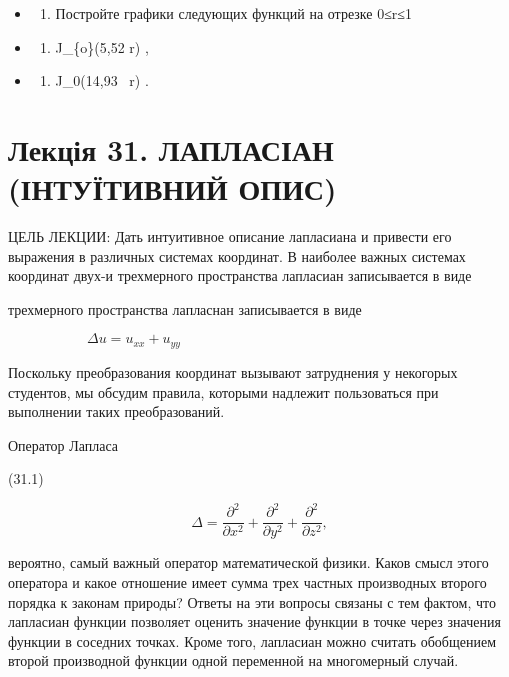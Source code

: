 \documentclass[
  ukrainian,
]{article}
\providecommand{\tightlist}{%
  \setlength{\itemsep}{0pt}\setlength{\parskip}{0pt}}
\begin{document}
\begin{itemize}
\tightlist
\item
  \begin{enumerate}
  \def\labelenumi{\arabic{enumi}.}
  \setcounter{enumi}{5}
  \tightlist
  \item
    Постройте графики следующих функций на отрезке 0≤r≤1
  \end{enumerate}
\item
  \begin{enumerate}
  \def\labelenumi{\alph{enumi})}
  \tightlist
  \item
    J\_\{o\}(5,52 r) ,
  \end{enumerate}
\item
  \begin{enumerate}
  \def\labelenumi{\arabic{enumi})}
  \setcounter{enumi}{5}
  \tightlist
  \item
    J\_0(14,93 ~r) .
  \end{enumerate}
\end{itemize}

\section{Лекція 31. ЛАПЛАСІАН (ІНТУЇТИВНИЙ
ОПИС)}\label{ux43bux435ux43aux446ux456ux44f-31.-ux43bux430ux43fux43bux430ux441ux456ux430ux43d-ux456ux43dux442ux443ux457ux442ux438ux432ux43dux438ux439-ux43eux43fux438ux441}

ЦЕЛЬ ЛЕКЦИИ: Дать интуитивное описание лапласиана и привести его
выражения в различных системах координат. В наиболее важных системах
координат двух-и трехмерного пространства лапласиан записывается в виде

трехмерного пространства лапласнан записывается в виде

\[
\Delta u = u_{xx} + u_{yy} \qquad \qquad \qquad \qquad \qquad \qquad \qquad \qquad \qquad
\]

Поскольку преобразования координат вызывают затруднения у некогорых
студентов, мы обсудим правила, которыми надлежит пользоваться при
выполнении таких преобразований.

Оператор Лапласа

(31.1)

\[
\Delta = \frac{\partial^2}{\partial x^2} + \frac{\partial^2}{\partial y^2} + \frac{\partial^2}{\partial z^2},
\]

вероятно, самый важный оператор математической физики. Каков смысл этого
оператора и какое отношение имеет сумма трех частных производных второго
порядка к законам природы? Ответы на эти вопросы связаны с тем фактом,
что лапласиан функции позволяет оценить значение функции в точке через
значения функции в соседних точках. Кроме того, лапласиан можно считать
обобщением второй производной функции одной переменной на многомерный
случай.
\end{document}
